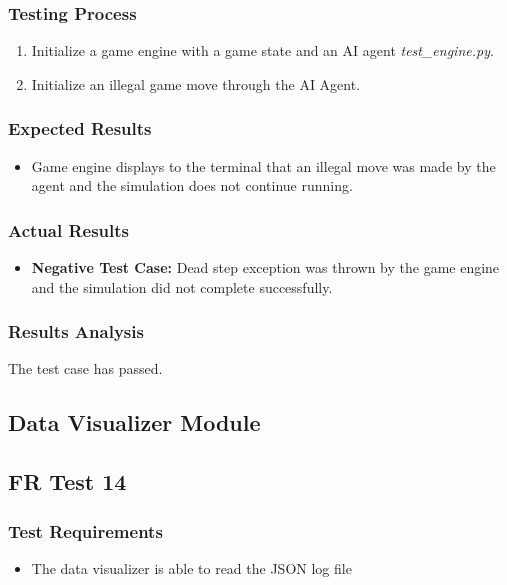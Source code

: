\documentclass[12pt, titlepage]{article}
\providecommand{\DIFaddbegin}{} %
\providecommand{\DIFaddend}{} %
\begin{document}
\subsubsection{Testing Process}
\begin{enumerate}
    \item Initialize a game engine with a game state and an AI agent \textit{test\_engine.py}. 
    \item Initialize an illegal game move through the AI Agent.
\end{enumerate}
\subsubsection{Expected Results}
\begin{itemize}
    \item Game engine displays to the terminal that an illegal move was made by the agent and the simulation does not continue running.
\end{itemize}
\subsubsection{Actual Results}
\begin{itemize}
    \item \textbf{Negative Test Case:} Dead step exception was thrown by the game engine and the simulation did not complete successfully.
\end{itemize}
\subsubsection{Results Analysis}
The test case has passed.

\subsection{Data Visualizer Module}
\subsection{FR Test 14}\DIFaddbegin \label{FRT14} 
\DIFaddend \subsubsection{Test Requirements}
\begin{itemize}
    \item The data visualizer is able to read the JSON log file

\end{itemize}
\end{document}
